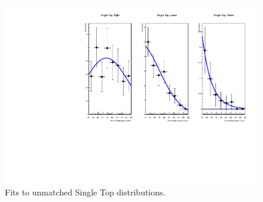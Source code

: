 \begin{figure}[ht!]
\centering
\includegraphics[scale=0.87]{figs/WtagSF/SingleTop_fits.pdf}
\caption{Fits to unmatched Single Top distributions.}\label{fig:bkgIII}
\end{figure}
